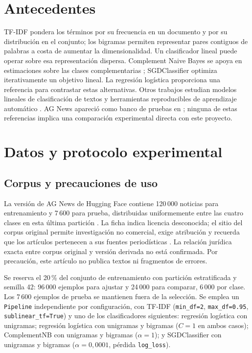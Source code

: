 \documentclass[conference]{IEEEtran}
\begin{document}
\section{Antecedentes}
TF-IDF pondera los términos por su frecuencia en un documento y por su
distribución en el conjunto; los bigramas permiten representar pares
contiguos de palabras a costa de aumentar la dimensionalidad. Un
clasificador lineal puede operar sobre esa representación dispersa.
Complement Naive Bayes se apoya en estimaciones sobre las clases
complementarias \cite{rennie}; SGDClassifier optimiza iterativamente
un objetivo lineal. La regresión logística proporciona una referencia
para contrastar estas alternativas. Otros trabajos estudian modelos
lineales de clasificación de textos \cite{joachims} y herramientas
reproducibles de aprendizaje automático \cite{pedregosa}. AG News
apareció como banco de pruebas en \cite{zhang}; ninguna de estas
referencias implica una comparación experimental directa con este
proyecto.

\section{Datos y protocolo experimental}
\subsection{Corpus y precauciones de uso}
La versión de AG News de Hugging Face contiene 120\,000 noticias para
entrenamiento y 7\,600 para prueba, distribuidas uniformemente entre
las cuatro clases en esta última partición \cite{agnews}. La ficha
indica licencia desconocida; el sitio del corpus original permite
investigación no comercial, exige atribución y recuerda que los
artículos pertenecen a sus fuentes periodísticas \cite{gulli}.
La relación jurídica exacta entre corpus original y versión derivada
no está confirmada. Por precaución, este artículo no publica textos
ni fragmentos de errores.

Se reserva el 20\,\% del conjunto de entrenamiento con partición
estratificada y semilla 42: 96\,000 ejemplos para ajustar y 24\,000
para comparar, 6\,000 por clase. Los 7\,600 ejemplos de prueba
se mantienen fuera de la selección. Se emplea un \texttt{Pipeline}
independiente por configuración, con TF-IDF
(\texttt{min\_df=2}, \texttt{max\_df=0.95},
\texttt{sublinear\_tf=True}) y uno de los clasificadores siguientes:
regresión logística con unigramas; regresión logística con unigramas
y bigramas (\(C=1\) en ambos casos); ComplementNB con unigramas y
bigramas (\(\alpha=1\)); y SGDClassifier con unigramas y bigramas
(\(\alpha=0{,}0001\), pérdida \texttt{log\_loss}).
\end{document}

